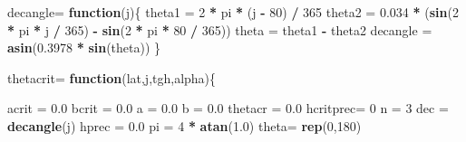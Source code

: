 \documentclass[
]{book}
\newenvironment{Shaded}{\begin{snugshade}}{\end{snugshade}}
\newcommand{\ControlFlowTok}[1]{\textcolor[rgb]{0.13,0.29,0.53}{\textbf{#1}}}
\newcommand{\DecValTok}[1]{\textcolor[rgb]{0.00,0.00,0.81}{#1}}
\newcommand{\FloatTok}[1]{\textcolor[rgb]{0.00,0.00,0.81}{#1}}
\newcommand{\KeywordTok}[1]{\textcolor[rgb]{0.13,0.29,0.53}{\textbf{#1}}}
\newcommand{\NormalTok}[1]{#1}
\newcommand{\OperatorTok}[1]{\textcolor[rgb]{0.81,0.36,0.00}{\textbf{#1}}}
\newcommand{\StringTok}[1]{\textcolor[rgb]{0.31,0.60,0.02}{#1}}
\begin{document}
\begin{Shaded}
\begin{Highlighting}[]
\NormalTok{decangle=}\StringTok{ }\ControlFlowTok{function}\NormalTok{(j)\{}
\NormalTok{  theta1 =}\StringTok{ }\DecValTok{2} \OperatorTok{*}\StringTok{ }\NormalTok{pi }\OperatorTok{*}\StringTok{ }\NormalTok{(j }\OperatorTok{-}\StringTok{ }\DecValTok{80}\NormalTok{) }\OperatorTok{/}\StringTok{ }\DecValTok{365}
\NormalTok{  theta2 =}\StringTok{ }\FloatTok{0.034} \OperatorTok{*}\StringTok{ }\NormalTok{(}\KeywordTok{sin}\NormalTok{(}\DecValTok{2} \OperatorTok{*}\StringTok{ }\NormalTok{pi }\OperatorTok{*}\StringTok{ }\NormalTok{j }\OperatorTok{/}\StringTok{ }\DecValTok{365}\NormalTok{) }\OperatorTok{-}\StringTok{ }\KeywordTok{sin}\NormalTok{(}\DecValTok{2} \OperatorTok{*}\StringTok{ }\NormalTok{pi }\OperatorTok{*}\StringTok{ }\DecValTok{80} \OperatorTok{/}\StringTok{ }\DecValTok{365}\NormalTok{))}
\NormalTok{  theta =}\StringTok{ }\NormalTok{theta1 }\OperatorTok{-}\StringTok{ }\NormalTok{theta2}
\NormalTok{  decangle =}\StringTok{ }\KeywordTok{asin}\NormalTok{(}\FloatTok{0.3978} \OperatorTok{*}\StringTok{ }\KeywordTok{sin}\NormalTok{(theta))}
\NormalTok{\}}

\NormalTok{thetacrit=}\StringTok{ }\ControlFlowTok{function}\NormalTok{(lat,j,tgh,alpha)\{}
  
\NormalTok{  acrit =}\StringTok{ }\FloatTok{0.0}
\NormalTok{  bcrit =}\StringTok{ }\FloatTok{0.0}
\NormalTok{  a =}\StringTok{ }\FloatTok{0.0}
\NormalTok{  b =}\StringTok{ }\FloatTok{0.0}
\NormalTok{  thetacr =}\StringTok{ }\FloatTok{0.0}
\NormalTok{  hcritprec=}\StringTok{ }\DecValTok{0}
\NormalTok{  n  =}\StringTok{ }\DecValTok{3}
\NormalTok{  dec =}\StringTok{ }\KeywordTok{decangle}\NormalTok{(j)}
\NormalTok{  hprec =}\StringTok{ }\FloatTok{0.0}
\NormalTok{  pi =}\StringTok{ }\DecValTok{4} \OperatorTok{*}\StringTok{ }\KeywordTok{atan}\NormalTok{(}\FloatTok{1.0}\NormalTok{)}
\NormalTok{  theta=}\StringTok{ }\KeywordTok{rep}\NormalTok{(}\DecValTok{0}\NormalTok{,}\DecValTok{180}\NormalTok{)}
  

\end{Highlighting}
\end{Shaded}
\end{document}
